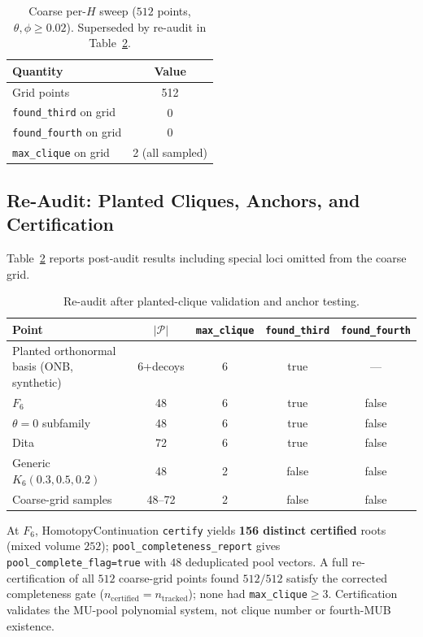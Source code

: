 \documentclass[onecolumn]{IEEEtran}
\begin{document}
\begin{table}[t]
\caption{Coarse per-$H$ sweep ($512$ points, $\theta,\phi\ge0.02$). Superseded by re-audit in Table~\ref{tab:reaudit}.}
\label{tab:sweep}
\centering
\begin{tabular}{@{}lc@{}}
\toprule
Quantity & Value \\
\midrule
Grid points & 512 \\
\texttt{found\_third} on grid & 0 \\
\texttt{found\_fourth} on grid & 0 \\
\texttt{max\_clique} on grid & 2 (all sampled) \\
\bottomrule
\end{tabular}
\end{table}

\subsection{Re-Audit: Planted Cliques, Anchors, and Certification}
\label{sec:reaudit}
Table~\ref{tab:reaudit} reports post-audit results including special loci omitted from the coarse grid.

\begin{table}[t]
\caption{Re-audit after planted-clique validation and anchor testing.}
\label{tab:reaudit}
\centering
\small
\begin{tabular}{@{}lcccc@{}}
\toprule
Point & $|\mathcal{P}|$ & \texttt{max\_clique} & \texttt{found\_third} & \texttt{found\_fourth} \\
\midrule
Planted orthonormal basis (ONB, synthetic) & 6+decoys & 6 & true & --- \\
$F_6$ & 48 & 6 & true & false \\
$\theta=0$ subfamily & 48 & 6 & true & false \\
Dita & 72 & 6 & true & false \\
Generic $K_6(0.3,0.5,0.2)$ & 48 & 2 & false & false \\
Coarse-grid samples & 48--72 & 2 & false & false \\
\bottomrule
\end{tabular}
\end{table}

At $F_6$, HomotopyContinuation \texttt{certify} yields \textbf{156 distinct certified} roots (mixed volume $252$); \texttt{pool\_completeness\_report} gives \texttt{pool\_complete\_flag=true} with $48$ deduplicated pool vectors.
A full re-certification of all $512$ coarse-grid points found \textbf{$512/512$} satisfy the corrected completeness gate ($n_{\mathrm{certified}}=n_{\mathrm{tracked}}$); none had \texttt{max\_clique}$\ge3$.
Certification validates the MU-pool polynomial system, not clique number or fourth-MUB existence.
\end{document}
